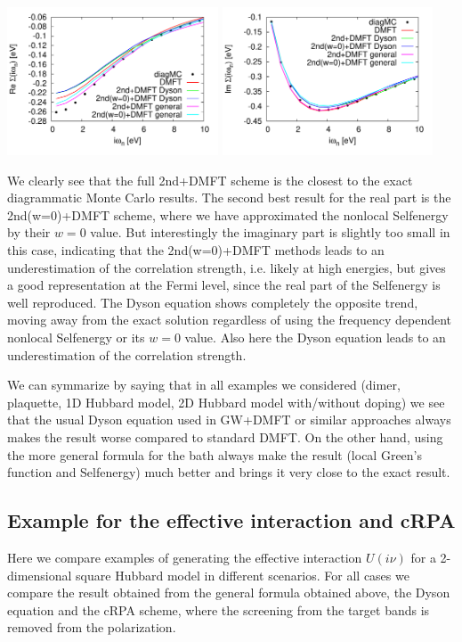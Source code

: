 \documentclass[12pt,a4paper]{scrartcl}
\numberwithin{equation}{section}
\begin{document}
\includegraphics[width=0.47\textwidth]{figs/bathNonlocFromDMFTderiv/Sigma_2DHubbard_real.pdf}
\includegraphics[width=0.47\textwidth]{figs/bathNonlocFromDMFTderiv/Sigma_2DHubbard_imag.pdf}

We clearly see that the full 2nd+DMFT scheme is the closest to the exact diagrammatic Monte Carlo
results. The second best result for the real part is the 2nd(w=0)+DMFT scheme, where we have approximated the 
nonlocal Selfenergy by their $w=0$ value. But interestingly the imaginary part is slightly too small in this case,
indicating that the 2nd(w=0)+DMFT methods leads to an underestimation of the correlation strength, i.e. likely at high energies, but 
gives a good representation at the Fermi level, since the real part of the Selfenergy is well reproduced.
The Dyson equation shows completely the opposite trend, moving away from the exact solution
regardless of using the frequency dependent nonlocal Selfenergy or its $w=0$ value. 
Also here the Dyson equation leads to an underestimation
of the correlation strength.

\bigskip

We can symmarize by saying that in all examples we considered (dimer, plaquette, 1D Hubbard model, 2D Hubbard model with/without doping)
we see that the usual Dyson equation used in GW+DMFT or similar approaches always makes the result worse compared
to standard DMFT.
On the other hand, using the more general formula for the bath always make the result (local Green's function 
and Selfenergy) much better and brings it very close to the exact result.

\subsection{Example for the effective interaction and cRPA}
Here we compare examples of generating the effective interaction $U(i\nu)$ 
for a 2-dimensional square Hubbard model in different scenarios.
For all cases we compare the result obtained from the general
formula obtained above, the Dyson equation and the cRPA
scheme, where the screening from the target bands is removed from
the polarization. 
\end{document}
